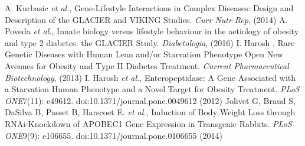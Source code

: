 \documentclass{article}
\begin{document}
\begin{thebibliography}{99} %
A. Kurbasic \textit{et al.}, Gene-Lifestyle Interactions in Complex Diseases: Design and Description of the GLACIER and VIKING Studies.
\newblock \textit{Curr Nutr Rep}, (2014)
A. Poveda \textit{et al.}, Innate biology versus lifestyle behaviour in the aetiology of obesity and type 2 diabetes: the GLACIER Study.
\newblock \textit{Diabetologia}, (2016)
I. Harosh , Rare Genetic Diseases with Human Lean and/or Starvation Phenotype Open New Avenues for Obesity and Type II Diabetes Treatment.
\newblock \textit{Current Pharmaceutical Biotechnology}, (2013)
I. Harosh \textit{et al.}, Enteropeptidase: A Gene Associated with a Starvation Human Phenotype and a Novel Target for Obesity Treatment.
\newblock \textit{PLoS ONE}7(11): e49612. doi:10.1371/journal.pone.0049612 (2012)
Jolivet G, Braud S, DaSilva B, Passet B, Harscoet E. \textit{et al.}, Induction of Body Weight Loss through RNAi-Knockdown of APOBEC1 Gene Expression in Transgenic Rabbits.
\newblock \textit{PLoS ONE}9(9): e106655. doi:10.1371/journal.pone.0106655 (2014)



\end{thebibliography}
\end{document}
